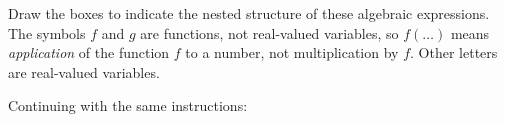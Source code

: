 
Draw the boxes to indicate the nested structure of these algebraic expressions.
The symbols $f$ and $g$ are functions, not real-valued variables, so $f(\dots)$ means \emph{application} of the function $f$ to a number, not multiplication by $f$.
Other letters are real-valued variables.
\bigskip

\begin{multicols}{2}
 \begin{ProblemSet}[pencil space=1in]
 \end{ProblemSet}
\end{multicols}

\newpage
{}

Continuing with the same instructions:

\begin{multicols}{2}
 \begin{ProblemSet}[pencil space=0.75in]
 \end{ProblemSet}
\end{multicols}


